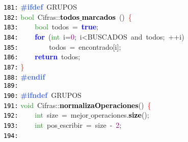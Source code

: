 \documentclass[a4paper,10pt]{scrartcl}
\begin{document}
{   \mbox{}\texttt{\textcolor{Black}{181:}} \textbf{\textcolor{RoyalBlue}{\#ifdef}}\ GRUPOS \\
   \mbox{}\texttt{\textcolor{Black}{182:}} \textcolor{ForestGreen}{bool}\ Cifras\textcolor{BrickRed}{::}\textbf{\textcolor{Black}{todos$\_$marcados}}\ \textcolor{BrickRed}{()}\ \textcolor{Red}{\{} \\
   \mbox{}\texttt{\textcolor{Black}{183:}} \ \ \ \ \textcolor{ForestGreen}{bool}\ todos\ \textcolor{BrickRed}{=}\ \textbf{\textcolor{Blue}{true}}\textcolor{BrickRed}{;} \\
   \mbox{}\texttt{\textcolor{Black}{184:}} \ \ \ \ \textbf{\textcolor{Blue}{for}}\ \textcolor{BrickRed}{(}\textcolor{ForestGreen}{int}\ i\textcolor{BrickRed}{=}\textcolor{Purple}{0}\textcolor{BrickRed}{;}\ i\textcolor{BrickRed}{\textless{}}BUSCADOS\ \textcolor{TealBlue}{and}\ todos\textcolor{BrickRed}{;}\ \textcolor{BrickRed}{++}i\textcolor{BrickRed}{)} \\
   \mbox{}\texttt{\textcolor{Black}{185:}} \ \ \ \ \ \ \ \ todos\ \textcolor{BrickRed}{=}\ encontrado\textcolor{BrickRed}{[}i\textcolor{BrickRed}{];} \\
   \mbox{}\texttt{\textcolor{Black}{186:}} \ \ \ \ \textbf{\textcolor{Blue}{return}}\ todos\textcolor{BrickRed}{;} \\
   \mbox{}\texttt{\textcolor{Black}{187:}} \textcolor{Red}{\}} \\
   \mbox{}\texttt{\textcolor{Black}{188:}} \textbf{\textcolor{RoyalBlue}{\#endif}} \\
   \mbox{}\texttt{\textcolor{Black}{189:}}  \\
   \mbox{}\texttt{\textcolor{Black}{190:}} \textbf{\textcolor{RoyalBlue}{\#ifndef}}\ GRUPOS \\
   \mbox{}\texttt{\textcolor{Black}{191:}} \textcolor{ForestGreen}{void}\ Cifras\textcolor{BrickRed}{::}\textbf{\textcolor{Black}{normalizaOperaciones}}\textcolor{BrickRed}{()}\ \textcolor{Red}{\{} \\
   \mbox{}\texttt{\textcolor{Black}{192:}} \ \ \ \ \textcolor{ForestGreen}{int}\ size\ \textcolor{BrickRed}{=}\ mejor$\_$operaciones\textcolor{BrickRed}{.}\textbf{\textcolor{Black}{size}}\textcolor{BrickRed}{();} \\
   \mbox{}\texttt{\textcolor{Black}{193:}} \ \ \ \ \textcolor{ForestGreen}{int}\ pos$\_$escribir\ \textcolor{BrickRed}{=}\ size\ \textcolor{BrickRed}{-}\ \textcolor{Purple}{2}\textcolor{BrickRed}{;} \\
   \mbox{}\texttt{\textcolor{Black}{194:}} \ \ \ \  \\
}
\end{document}
